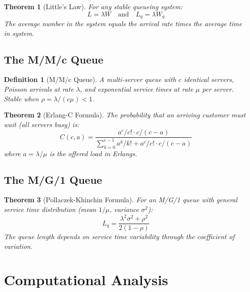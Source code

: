\documentclass[a4paper, 11pt]{article}
\newtheorem{definition}{Definition}[section]
\newtheorem{theorem}{Theorem}[section]
\begin{document}
\begin{theorem}[Little's Law]
For any stable queueing system:
\begin{equation}
L = \lambda W \quad \text{and} \quad L_q = \lambda W_q
\end{equation}
The average number in the system equals the arrival rate times the average time in system.
\end{theorem}

\subsection{The M/M/c Queue}

\begin{definition}[M/M/c Queue]
A multi-server queue with $c$ identical servers, Poisson arrivals at rate $\lambda$, and exponential service times at rate $\mu$ per server. Stable when $\rho = \lambda/(c\mu) < 1$.
\end{definition}

\begin{theorem}[Erlang-C Formula]
The probability that an arriving customer must wait (all servers busy) is:
\begin{equation}
C(c, a) = \frac{a^c/c! \cdot c/(c-a)}{\sum_{k=0}^{c-1} a^k/k! + a^c/c! \cdot c/(c-a)}
\end{equation}
where $a = \lambda/\mu$ is the offered load in Erlangs.
\end{theorem}

\subsection{The M/G/1 Queue}

\begin{theorem}[Pollaczek-Khinchin Formula]
For an M/G/1 queue with general service time distribution (mean $1/\mu$, variance $\sigma^2$):
\begin{equation}
L_q = \frac{\lambda^2 \sigma^2 + \rho^2}{2(1-\rho)}
\end{equation}
The queue length depends on service time variability through the coefficient of variation.
\end{theorem}

\section{Computational Analysis}
\end{document}
